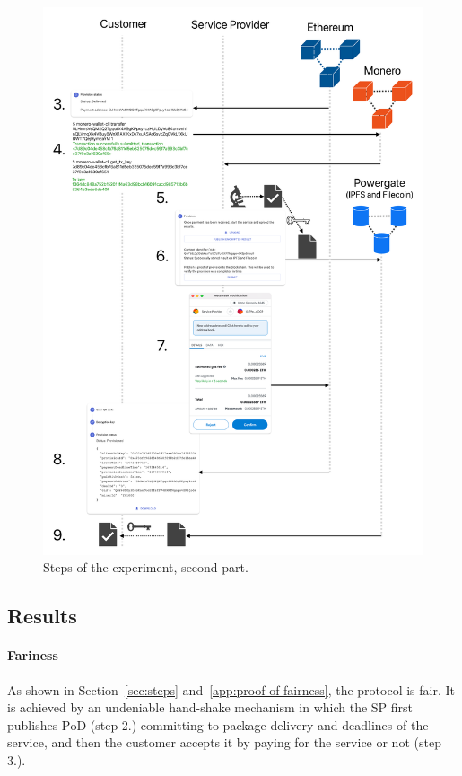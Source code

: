 \begin{figure}
  \includegraphics[height=0.95\textheight,keepaspectratio]{anonser-experiment2.pdf}
  \caption{Steps of the experiment, second part.}\label{fig:anonser-experiment2}
\end{figure}

\fi
\subsection{Results}

\paragraph{Fariness}
As shown in Section~\ref{sec:steps} and~\ref{app:proof-of-fairness}, 
the protocol is fair. It is achieved by an undeniable hand-shake mechanism in which the SP first publishes $\mathrm{PoD}$ (step 2.) committing to package delivery and deadlines of the service, and then the customer accepts it by paying for the service or not (step 3.).

